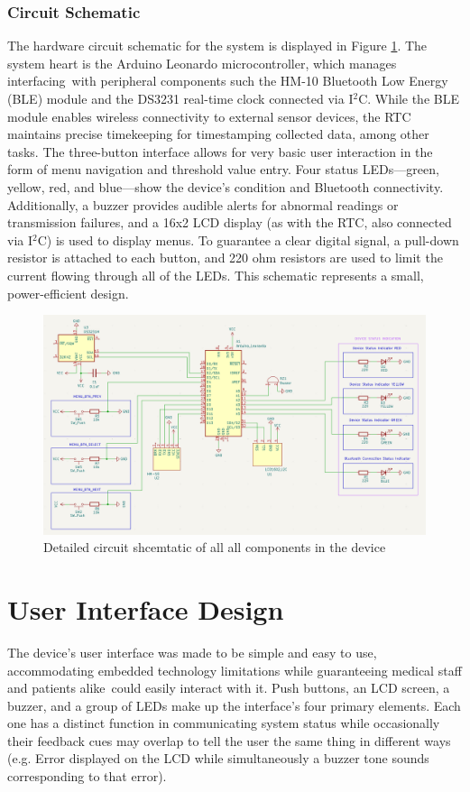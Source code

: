 \subsubsection{Circuit Schematic}
The hardware circuit schematic for the system is displayed in Figure \ref{fig:circuit_diagram}. The system heart is the Arduino Leonardo microcontroller, which manages interfacing with peripheral components such the HM-10 Bluetooth Low Energy (BLE) module and the DS3231 real-time clock connected via I$^2$C. While the BLE module enables wireless connectivity to external sensor devices, the RTC maintains precise timekeeping for timestamping collected data, among other tasks.
The three-button interface allows for very basic user interaction in the form of menu navigation and threshold value entry. Four status LEDs—green, yellow, red, and blue—show the device's condition and Bluetooth connectivity. Additionally, a buzzer provides audible alerts for abnormal readings or transmission failures, and a 16x2 LCD display (as with the RTC, also connected via I$^2$C) is used to display menus. To guarantee a clear digital signal, a pull-down resistor is attached to each button, and 220 ohm resistors are used to limit the current flowing through all of the LEDs. This schematic represents a small, power-efficient design.
\begin{figure}[H]
\centering
\includegraphics[width=\textwidth]{diagrams/schematic_rev3}
\caption{Detailed circuit shcemtatic of all all components in the device}
\label{fig:circuit_diagram}
\end{figure}

\section{User Interface Design} %
The device's user interface was made to be simple and easy to use, accommodating embedded technology limitations while guaranteeing medical staff and patients alike could easily interact with it. Push buttons, an LCD screen, a buzzer, and a group of LEDs make up the interface's four primary elements. Each one has a distinct function in communicating system status while occasionally their feedback cues may overlap to tell the user the same thing in different ways (e.g. Error displayed on the LCD while simultaneously a buzzer tone sounds corresponding to that error).

